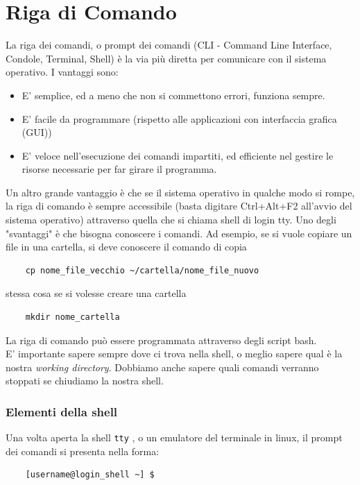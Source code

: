 \chapter{Riga di Comando}
La riga dei comandi, o prompt dei comandi (CLI - Command Line Interface, Condole, Terminal, Shell) è la via più diretta per comunicare con il sistema operativo. I vantaggi sono:
\begin{itemize}
	\item E' semplice, ed a meno che non si commettono errori, funziona sempre.
	\item E' facile da programmare (rispetto alle applicazioni con interfaccia grafica (GUI))
	\item E' veloce nell'esecuzione dei comandi impartiti, ed efficiente nel gestire le risorse necessarie per far girare il programma.
\end{itemize}
Un altro grande vantaggio è che se il sistema operativo in qualche modo si rompe, la riga di comando è sempre accessibile (basta digitare Ctrl+Alt+F2 all'avvio del sistema operativo) attraverso quella che si chiama shell di login tty. Uno degli "svantaggi" è che bisogna conoscere i comandi. 
Ad esempio, se si vuole copiare un file in una cartella, si deve conoscere il comando di copia

\begin{verbatim}
 	cp nome_file_vecchio ~/cartella/nome_file_nuovo
\end{verbatim}
stessa cosa se si volesse creare una cartella

\begin{verbatim}
	mkdir nome_cartella
\end{verbatim}

La riga di comando può essere programmata attraverso degli script bash.\\
E' importante sapere sempre dove ci trova nella shell, o meglio sapere qual è la nostra \textit{working directory}. Dobbiamo anche sapere quali comandi verranno stoppati se chiudiamo la nostra shell.

\subsection{Elementi della shell}
Una volta aperta la shell \verb"tty"
, o un emulatore del terminale in linux, il prompt dei comandi si presenta nella forma:

\begin{verbatim}
	[username@login_shell ~] $
\end{verbatim}

